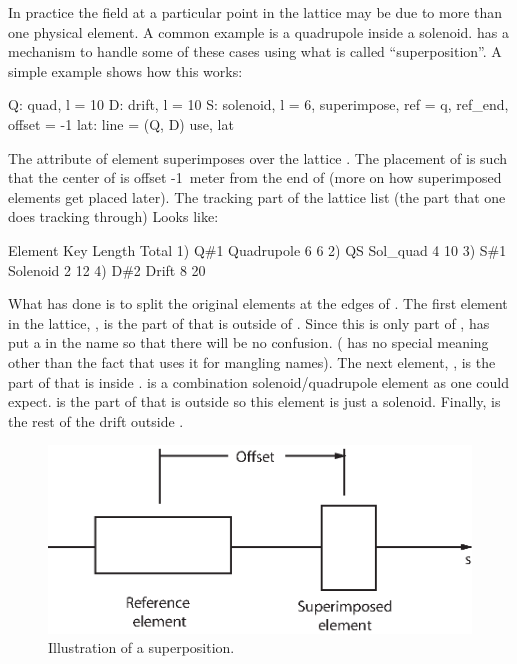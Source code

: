 In practice the field at a particular point in the lattice may be due
to more than one physical element. A common example is a quadrupole
inside a solenoid. \bmad has a mechanism to handle some of these
cases using what is called ``superposition''. A simple example shows
how this works:
\begin{example}
  Q: quad, l = 10
  D: drift, l = 10
  S: solenoid, l = 6, superimpose, ref = q, ref_end, offset = -1
  lat: line = (Q, D)
  use, lat
\end{example}
The  attribute of element  superimposes 
over the lattice . The placement of  is such that the
center of  is offset -1~meter from the end of  (more on how
superimposed elements get placed later). The tracking part of the
lattice list (the part that one does tracking through) Looks like:
\begin{example}
        Element   Key         Length  Total     
  1)    Q{\#}1       Quadrupole   6        6
  2)    Q{\B}S       Sol_quad     4       10
  3)    S{\#}1       Solenoid     2       12
  4)    D{\#}2       Drift        8       20
\end{example}
What \bmad has done is to split the original elements  at
the edges of .  The first element in the lattice, , is
the part of  that is outside of . Since this is only part
of , \bmad has put a  in the name so that there will be
no confusion.  (\vn{\#} has no special meaning other than the fact
that \bmad uses it for mangling names). The next element, ,
is the part of  that is inside .  is a
combination solenoid/quadrupole element as one could
expect.  is the part of  that is outside  so
this element is just a solenoid. Finally,  is the rest of the
drift outside .

\begin{figure}[tb]
\centering 
\includegraphics{superimpose.eps} 
\caption[Superposition Illustration.]
{Illustration of a superposition.}
\label{f:superimpose}
\end{figure}

